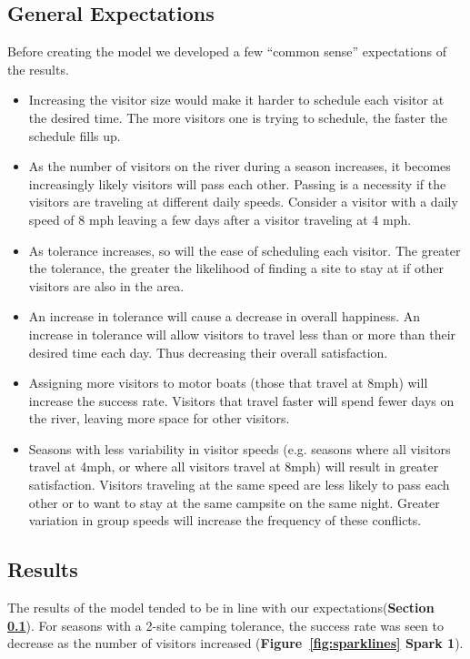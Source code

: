 \documentclass[11pt]{article} %
\begin{document}
\subsection{General Expectations}
\label{sec:expectations}
Before creating the model we developed a few ``common sense'' expectations of
the results.
\begin{itemize}
\item Increasing the visitor size
would make it harder to schedule each visitor at the desired time. The more
visitors one is trying to schedule, the faster the schedule fills up.

\item As the number of visitors on the river during a season increases, it
becomes increasingly likely visitors will pass each other. Passing
is a necessity if the visitors are traveling at different daily
speeds.  Consider a visitor with a daily speed of 8 mph leaving a few days
after a visitor traveling at 4 mph.

\item As tolerance increases, so will the ease of scheduling each visitor. The
greater the tolerance, the greater the likelihood of finding a site to stay
at if other visitors are also in the area.

\item An increase in tolerance will cause a decrease in overall happiness.
An increase in tolerance will allow visitors to travel less than or more
than their desired time each day. Thus decreasing their overall satisfaction.

\item Assigning more visitors to motor boats (those that travel
at 8mph) will increase the success rate. Visitors that travel faster will
spend fewer days on the river, leaving more space for other visitors.

\item Seasons with less variability in visitor speeds (e.g. seasons where
all visitors travel at 4mph, or where all visitors travel at 8mph) will result
in greater satisfaction. Visitors traveling at the same speed are less likely
to pass each other or to want to stay at the same campsite on the same night.
Greater variation in group speeds will increase the frequency of these
conflicts.
\end{itemize}

\subsection{Results}
\label{sec:results}
The results of the model tended to be in line with our
expectations(\textbf{Section \ref{sec:expectations}}). For seasons with a
2-site camping tolerance, the success rate
was seen to decrease as the number of visitors increased
(\textbf{Figure~\ref{fig:sparklines} Spark 1}).
\end{document}
